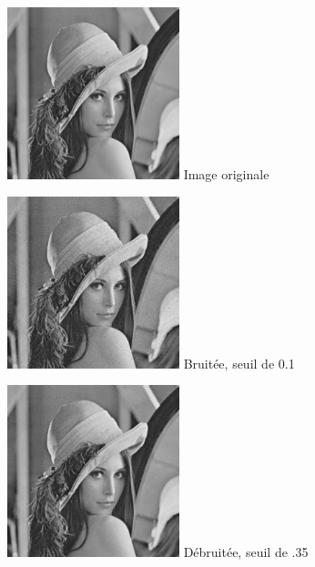 \documentclass{article}
\begin{document}
		
		\begin{figure}[!ht]
			\centering
			\begin{minipage}[t]{5cm}
				\centering
				\includegraphics[width=5cm,height=5cm]{lena.jpg}
				Image originale
			\end{minipage}
			\begin{minipage}[t]{5cm}
				\centering
				\includegraphics[width=5cm,height=5cm]{Additive/algo1_10.jpg}
				Bruitée, seuil de 0.1
			\end{minipage}
			\begin{minipage}[t]{5cm}
				\centering
				\includegraphics[width=5cm,height=5cm]{Additive/unset_algo1_10.jpg}
				Débruitée, seuil de .35
			\end{minipage}
		\end{figure}
		
\end{document}
